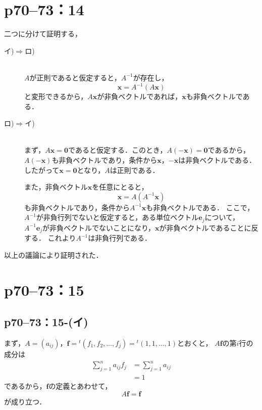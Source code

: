\section*{p70--73：14}

\begin{tproof}
  二つに分けて証明する，
  \begin{description}
    \item[イ)$\Longrightarrow$ロ)] \mbox{} \\
          $A$が正則であると仮定すると，$A^{-1}$が存在し，
          \[
            \bm{x} = A^{-1} (A\bm{x})
          \]
          と変形できるから，$A \bm{x}$が非負ベクトルであれば，$\bm{x}$も非負ベクトルである．
    \item[ロ)$\Longrightarrow$イ)] \mbox{} \\
          まず，$ A \bm{x} =\bm{0}$であると仮定する．このとき，$A (-\bm{x}) =\bm{0}$であるから，
          $A (-\bm{x})$も非負ベクトルであり，条件から$ \bm{x}$，$-\bm{x}$は非負ベクトルである．
          したがって$\bm{x}=\bm{0}$となり，$A$は正則である．

          また，非負ベクトル$\bm{x}$を任意にとると，
          \[
            \bm{x} = A (A^{-1} \bm{x})
          \]
          も非負ベクトルであり，条件から$A^{-1} \bm{x}$も非負ベクトルである．
          ここで，$A^{-1}$が非負行列でないと仮定すると，ある単位ベクトル$\bm{e}_j$について，
          $A^{-1} \bm{e}_j $が非負ベクトルでないことになり，$\bm{x}$が非負ベクトルであることに反する．
          これより$A^{-1}$は非負行列である．
  \end{description}
  以上の議論により証明された．
\end{tproof}






\section*{p70--73：15}


\subsection*{p70--73：15-(イ)}
\begin{tproof}
  まず，$A=(a_{ij})$，$\bm{f} = {}^t (f_1 , f_2,\dots,f_j) ={}^t (1,1,\dots,1)$とおくと，
  $A \bm{f}$の第$i$行の成分は
  \begin{align*}
    \sum_{j=1}^{n} a_{ij} f_j & = \sum_{j=1}^{n} a_{ij} \\
                              & =1
  \end{align*}
  であるから，$\bm{f}$の定義とあわせて，
  \[
    A \bm{f} =\bm{f}
  \]
  が成り立つ．
\end{tproof}


